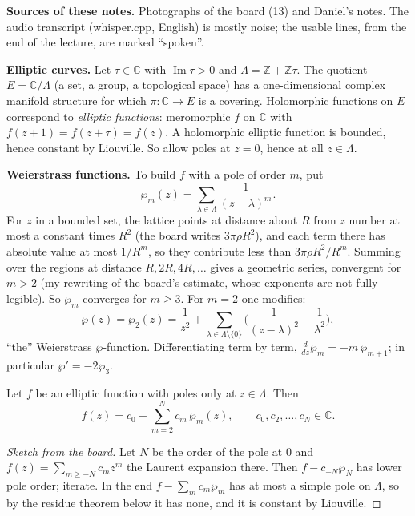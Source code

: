 \medskip\noindent
{\bf Sources of these notes.} Photographs of
the board (13) and Daniel's notes. The audio
transcript (whisper.cpp, English) is mostly
noise; the usable lines, from the end of the
lecture, are marked ``spoken''.

\medskip\noindent
{\bf Elliptic curves.} Let $\tau \in
\mathbb{C}$ with $\operatorname{Im}\tau > 0$
and $\Lambda = \mathbb{Z} + \mathbb{Z}\tau$.
The quotient $E = \mathbb{C}/\Lambda$ (a set,
a group, a topological space) has a
one-dimensional complex manifold structure
for which $\pi : \mathbb{C} \to E$ is a
covering. Holomorphic functions on $E$
correspond to \emph{elliptic functions}:
meromorphic $f$ on $\mathbb{C}$ with
$f(z+1) = f(z+\tau) = f(z)$. A holomorphic
elliptic function is bounded, hence
constant by Liouville. So allow poles at
$z = 0$, hence at all $z \in \Lambda$.

\medskip\noindent
{\bf Weierstrass functions.} To build $f$
with a pole of order $m$, put
$$
\wp_m(z) = \sum_{\lambda \in \Lambda}
\frac{1}{(z-\lambda)^m}.
$$
For $z$ in a bounded set, the lattice
points at distance about $R$ from $z$
number at most a constant times $R^2$ (the
board writes $3\pi\rho R^2$), and each term
there has absolute value at most $1/R^m$, so
they contribute less than $3\pi\rho
R^2/R^m$. Summing over the regions at
distance $R, 2R, 4R, \ldots$ gives a
geometric series, convergent for $m > 2$
(my rewriting of the board's estimate,
whose exponents are not fully legible). So
$\wp_m$ converges for $m \ge 3$. For $m = 2$
one modifies:
$$
\wp(z) = \wp_2(z) = \frac{1}{z^2}
+ \sum_{\lambda \in \Lambda \setminus \{0\}}
\Big(\frac{1}{(z-\lambda)^2}
- \frac{1}{\lambda^2}\Big),
$$
``the'' Weierstrass $\wp$-function.
Differentiating term by term,
$\frac{d}{dz}\wp_m = -m\,\wp_{m+1}$; in
particular $\wp' = -2\wp_3$.

\begin{proposition}
\label{proposition-elliptic-poles-on-lattice}
Let $f$ be an elliptic function with poles
only at $z \in \Lambda$. Then
$$
f(z) = c_0 + \sum_{m=2}^{N} c_m\,\wp_m(z),
\qquad c_0, c_2, \ldots, c_N \in
\mathbb{C}.
$$
\end{proposition}

\begin{proof}[Sketch from the board]
Let $N$ be the order of the pole at $0$ and
$f(z) = \sum_{m \ge -N} c_m z^m$ the Laurent
expansion there. Then $f - c_{-N}\wp_N$ has
lower pole order; iterate. In the end
$f - \sum_m c_m\wp_m$ has at most a simple
pole on $\Lambda$, so by the residue
theorem below it has none, and it is
constant by Liouville.
\end{proof}

